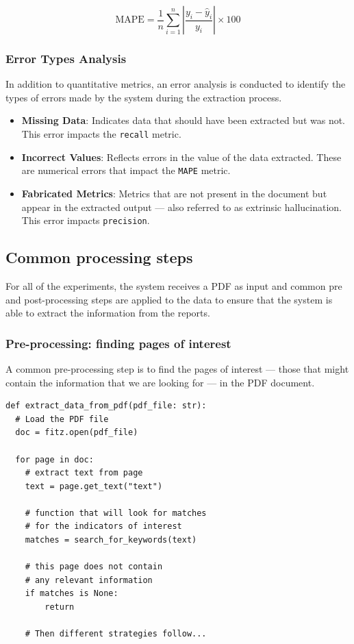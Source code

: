 \documentclass[english, 12pt, a4paper, elec, utf8, a-2b, online]{aaltothesis}
\begin{document}
\begin{equation}
    \text{MAPE} = \frac{1}{n} \sum_{i=1}^{n} \left| \frac{y_i - \hat{y}_i}{y_i} \right| \times 100
\end{equation}

\subsubsection{Error Types Analysis}

In addition to quantitative metrics, an error analysis is conducted to identify the types of errors made by the system during the extraction process.

\begin{itemize}
    \item \textbf{Missing Data}: Indicates data that should have been extracted but was not. This error impacts the \texttt{recall} metric.
    \item \textbf{Incorrect Values}: Reflects errors in the value of the data extracted. These are numerical errors that impact the \texttt{MAPE} metric.
    \item \textbf{Fabricated Metrics}: Metrics that are not present in the document but appear in the extracted output --- also referred to as extrinsic hallucination. This error impacts \texttt{precision}.
\end{itemize}

\subsection{Common processing steps}

For all of the experiments, the system receives a \ac{PDF} as input and common pre and post-processing steps are applied to the data to ensure that the system is able to extract the information from the reports.

\subsubsection{Pre-processing: finding pages of interest}

A common pre-processing step is to find the pages of interest --- those that might contain the information that we are looking for --- in the \ac{PDF} document.

\begin{verbatim}
def extract_data_from_pdf(pdf_file: str):
  # Load the PDF file
  doc = fitz.open(pdf_file)

  for page in doc:
    # extract text from page
    text = page.get_text("text")

    # function that will look for matches
    # for the indicators of interest
    matches = search_for_keywords(text)

    # this page does not contain
    # any relevant information
    if matches is None:
        return

    # Then different strategies follow...
\end{verbatim}
\end{document}
